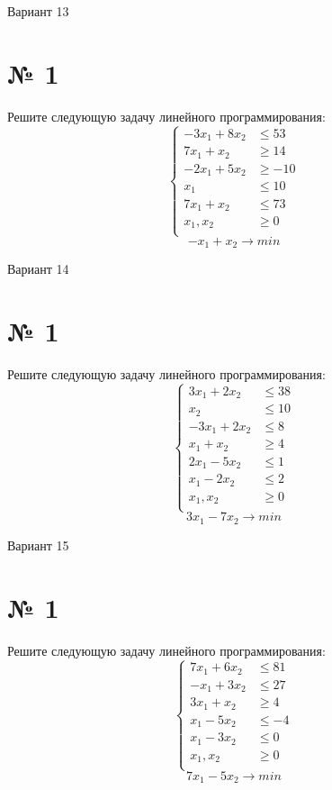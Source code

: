 \documentclass{article}%
\begin{document}
%
\newpage%
\begin{center}%
\begin{Huge}%
Вариант 13%
\end{Huge}%
\end{center}%
\section*{№ 1}%
\label{sec:1}%
Решите следующую задачу линейного программирования: %
\[%
\left\{\begin{aligned}-3x_{1}+8x_{2} & \le53 \\7x_{1}+x_{2} & \ge14 \\-2x_{1}+5x_{2} & \ge-10 \\x_{1} & \le10 \\7x_{1}+x_{2} & \le73 \\x_{1},x_{2} & \ge 0 \\\end{aligned}\right.%
\]%
\[%
-x_{1}+x_{2}  \to min%
\]

%
\newpage%
\begin{center}%
\begin{Huge}%
Вариант 14%
\end{Huge}%
\end{center}%
\section*{№ 1}%
\label{sec:1}%
Решите следующую задачу линейного программирования: %
\[%
\left\{\begin{aligned}3x_{1}+2x_{2} & \le38 \\x_{2} & \le10 \\-3x_{1}+2x_{2} & \le8 \\x_{1}+x_{2} & \ge4 \\2x_{1}-5x_{2} & \le1 \\x_{1}-2x_{2} & \le2 \\x_{1},x_{2} & \ge 0 \\\end{aligned}\right.%
\]%
\[%
3x_{1}-7x_{2}  \to min%
\]

%
\newpage%
\begin{center}%
\begin{Huge}%
Вариант 15%
\end{Huge}%
\end{center}%
\section*{№ 1}%
\label{sec:1}%
Решите следующую задачу линейного программирования: %
\[%
\left\{\begin{aligned}7x_{1}+6x_{2} & \le81 \\-x_{1}+3x_{2} & \le27 \\3x_{1}+x_{2} & \ge4 \\x_{1}-5x_{2} & \le-4 \\x_{1}-3x_{2} & \le0 \\x_{1},x_{2} & \ge 0 \\\end{aligned}\right.%
\]%
\[%
7x_{1}-5x_{2}  \to min%
\]
\end{document}
